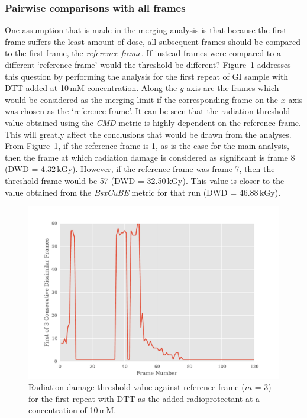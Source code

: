 \subsubsection{Pairwise comparisons with all frames}
\label{subs:Pairwise comparisons with all frames}
One assumption that is made in the merging analysis is that because the first frame suffers the least amount of dose, all subsequent frames should be compared to the first frame, the \textit{reference frame}.
If instead frames were compared to a different `reference frame' would the threshold be different?
Figure~\ref{fig:First n diff frames - DTT} addresses this question by performing the analysis for the first repeat of GI sample with DTT added at 10$\,$mM concentration.
Along the $y$-axis are the frames which would be considered as the merging limit if the corresponding frame on the $x$-axis was chosen as the `reference frame'.
It can be seen that the radiation threshold value obtained using the \textit{CMD} metric is highly dependent on the reference frame.
This will greatly affect the conclusions that would be drawn from the analyses.
From Figure~\ref{fig:First n diff frames - DTT}, if the reference frame is 1, as is the case for the main analysis, then the frame at which radiation damage is considered as significant is frame 8 (DWD = 4.32$\,$kGy).
However, if the reference frame was frame 7, then the threshold frame would be 57 (DWD = 32.50\,kGy).
This value is closer to the value obtained from the \textit{BsxCuBE} metric for that run (DWD = 46.88\,kGy).
\begin{figure}
    \centering
    \includegraphics[width=1.0\textwidth]{figures/saxs/dtt_first_n_plot.pdf}
    \caption[Radiation damage threshold value against reference frame ($m$ = 3) for the first repeat with DTT as the added radioprotectant at a concentration of 10\,mM.]{Radiation damage threshold value against reference frame ($m$ = 3) for the first repeat with DTT as the added radioprotectant at a concentration of 10\,mM.}
    \label{fig:First n diff frames - DTT}
\end{figure}

